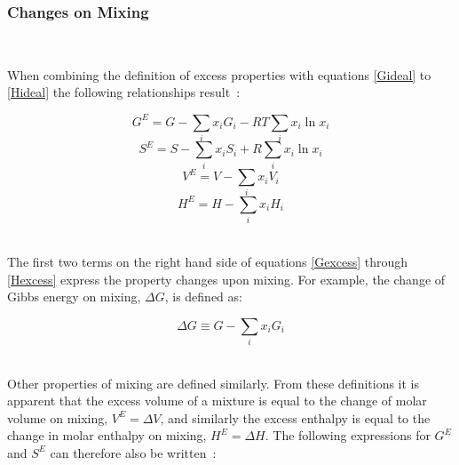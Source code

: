 \subsubsection{Changes on Mixing}\

When combining the definition of excess properties with equations \ref{Gideal} to \ref{Hideal} the following relationships result~\cite{SmithNessAbbott}:\

\begin{equation}
G^{E}  = G - \sum_{i}x_{i}G_{i}  - RT\sum_{i}x_{i}\ln x_{i} \label{Gexcess}
\end{equation}
\begin{equation}
S^{E}  = S - \sum_{i}x_{i}S_{i}  + R\sum_{i}x_{i}\ln x_{i}
\end{equation}
\begin{equation}
V^{E}  = V - \sum_{i}x_{i}V_{i}
\end{equation}
\begin{equation}
H^{E}  = H - \sum_{i}x_{i}H_{i} \label{Hexcess}
\end{equation}\


The first two terms on the right hand side of equations \ref{Gexcess} through \ref{Hexcess} express the property changes upon mixing. For example, the change of Gibbs energy on mixing, $\Delta G$, is defined as:

\begin{equation}
\Delta G \equiv G - \sum_{i} x_{i}G_{i}
\end{equation}\

Other properties of mixing are defined similarly. From these definitions it is apparent that the excess volume of a mixture is equal to the change of molar volume on mixing, $V^{E} = \Delta V$, and similarly the excess enthalpy is equal to the change in molar enthalpy on mixing, $H^{E} = \Delta H$. The following expressions for $G^{E}$ and $S^{E}$ can therefore also be written~\cite{SmithNessAbbott}:\

